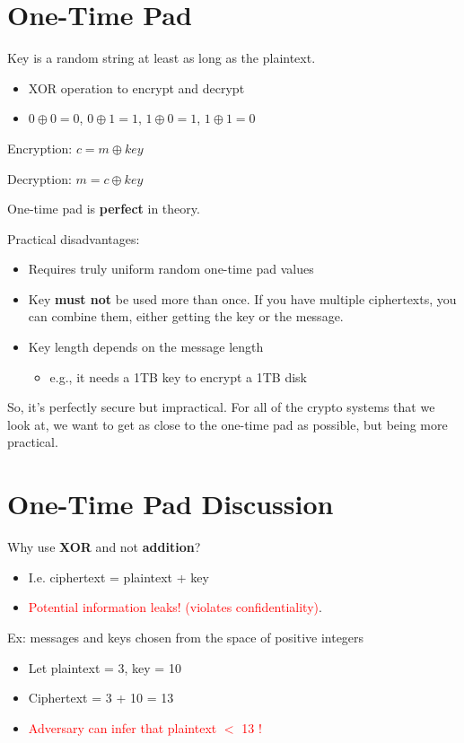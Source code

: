\documentclass[11pt]{article}
\begin{document}
\section*{One-Time Pad}

Key is a random string at least as long as the plaintext.

\begin{itemize}
	\item XOR operation to encrypt and decrypt
	\item $0 \oplus 0 = 0$, $0 \oplus 1 = 1$, $1 \oplus 0 = 1$, $1 \oplus 1 = 0$
\end{itemize}

Encryption: $c = m \oplus key$ 

Decryption: $m = c \oplus key$

One-time pad is \textbf{perfect} in theory.

Practical disadvantages:
\begin{itemize}
	\item Requires truly uniform random one-time pad values
	\item Key \textbf{must not} be used more than once. If you have multiple ciphertexts, you can combine them, either getting the key or the message.
	\item Key length depends on the message length
		\begin{itemize}
			\item e.g., it needs a 1TB key to encrypt a 1TB disk
		\end{itemize}
\end{itemize}

So, it's perfectly secure but impractical. For all of the crypto systems that we look at, we want to get as close to the one-time pad as possible, but being more practical. 

\section*{One-Time Pad Discussion}

Why use \textbf{XOR} and not \textbf{addition}?
\begin{itemize}
	\item I.e. ciphertext = plaintext + key
	\item \textcolor{red}{Potential information leaks! (violates confidentiality)}. 
\end{itemize}

Ex: messages and keys chosen from the space of positive integers
\begin{itemize}
	\item Let plaintext = 3, key = 10
	\item Ciphertext = 3 + 10 = 13
	\item \textcolor{red}{Adversary can infer that plaintext $<$ 13 !}
\end{itemize}
\end{document}
